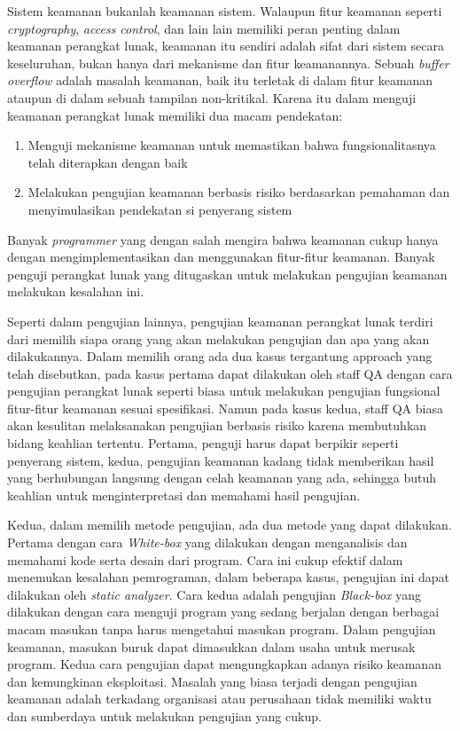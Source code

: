 Sistem keamanan bukanlah keamanan sistem. Walaupun fitur keamanan seperti \emph{cryptography},
\emph{access control}, dan lain lain memiliki peran penting dalam keamanan perangkat lunak,
keamanan itu sendiri adalah sifat dari sistem secara keseluruhan, bukan hanya dari mekanisme
dan fitur keamanannya. Sebuah \emph{buffer overflow} adalah masalah keamanan, baik itu terletak di dalam
fitur keamanan ataupun di dalam sebuah tampilan non-kritikal.
Karena itu dalam menguji keamanan perangkat lunak memiliki dua macam pendekatan:

\begin{enumerate}
    \item Menguji mekanisme keamanan untuk memastikan bahwa fungsionalitasnya telah diterapkan dengan baik
    \item Melakukan pengujian keamanan berbasis risiko berdasarkan pemahaman dan menyimulasikan pendekatan si penyerang sistem
\end{enumerate}

Banyak \emph{programmer} yang dengan salah mengira bahwa keamanan cukup hanya dengan mengimplementasikan dan
menggunakan fitur-fitur keamanan. Banyak penguji perangkat lunak yang ditugaskan untuk melakukan
pengujian keamanan melakukan kesalahan ini.

Seperti dalam pengujian lainnya, pengujian keamanan perangkat lunak terdiri dari memilih
siapa orang yang akan melakukan pengujian dan apa yang akan dilakukannya.
Dalam memilih orang ada dua kasus tergantung approach yang telah disebutkan,
pada kasus pertama dapat dilakukan oleh staff QA dengan cara pengujian
perangkat lunak seperti biasa untuk melakukan pengujian fungsional
fitur-fitur keamanan sesuai spesifikasi.
Namun pada kasus kedua, staff QA biasa akan kesulitan melaksanakan pengujian berbasis risiko
karena membutuhkan bidang keahlian tertentu.
Pertama, penguji harus dapat berpikir seperti penyerang sistem,
kedua, pengujian keamanan kadang tidak memberikan hasil yang berhubungan langsung dengan
celah keamanan yang ada, sehingga butuh keahlian untuk menginterpretasi dan memahami hasil pengujian.

Kedua, dalam memilih metode pengujian, ada dua metode yang dapat dilakukan.
Pertama dengan cara \emph{White-box} yang dilakukan dengan menganalisis dan memahami
kode serta desain dari program.
Cara ini cukup efektif dalam menemukan kesalahan pemrograman,
dalam beberapa kasus, pengujian ini dapat dilakukan oleh \emph{static analyzer}.
Cara kedua adalah pengujian \emph{Black-box} yang dilakukan dengan cara menguji program
yang sedang berjalan dengan berbagai macam masukan tanpa harus mengetahui masukan program.
Dalam pengujian keamanan, masukan buruk dapat dimasukkan dalam usaha untuk merusak program.
Kedua cara pengujian dapat mengungkapkan adanya risiko keamanan dan kemungkinan eksploitasi.
Masalah yang biasa terjadi dengan pengujian keamanan adalah terkadang organisasi atau perusahaan
tidak memiliki waktu dan sumberdaya untuk melakukan pengujian yang cukup.

